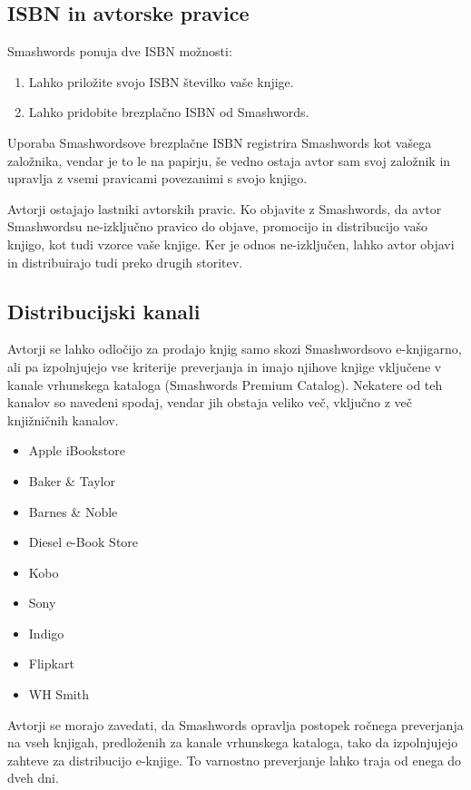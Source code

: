 \documentclass[a4paper, 12pt]{book}
\begin{document}
\subsection{ISBN in avtorske pravice}
Smashwords ponuja dve ISBN možnosti:
\begin{enumerate}
	\item Lahko priložite svojo ISBN številko vaše knjige.
	\item Lahko pridobite brezplačno ISBN od Smashwords.
\end{enumerate}

Uporaba Smashwordsove brezplačne ISBN registrira Smashwords kot vašega založnika, vendar je to le na papirju, še vedno ostaja avtor sam svoj založnik in upravlja z vsemi pravicami povezanimi s svojo knjigo.

Avtorji ostajajo lastniki avtorskih pravic. Ko objavite z Smashwords, da avtor Smashwordsu ne-izključno pravico do objave, promocijo in distribucijo vašo knjigo, kot tudi vzorce vaše knjige. Ker je odnos ne-izključen, lahko avtor objavi in distribuirajo tudi preko drugih storitev.

\subsection{Distribucijski kanali}
Avtorji se lahko odločijo za prodajo knjig samo skozi Smashwordsovo e-knjigarno, ali pa izpolnjujejo vse kriterije preverjanja in imajo njihove knjige vključene v kanale vrhunskega kataloga (Smashwords Premium Catalog). Nekatere od teh kanalov so navedeni spodaj, vendar jih obstaja veliko več, vključno z več knjižničnih kanalov. 
\begin{itemize}
	\item Apple iBookstore
	\item Baker \& Taylor
	\item Barnes \& Noble
	\item Diesel e-Book Store
	\item Kobo
	\item Sony
	\item Indigo
	\item Flipkart
	\item WH Smith
\end{itemize}

Avtorji se morajo zavedati, da Smashwords opravlja postopek ročnega preverjanja na vseh knjigah, predloženih za kanale vrhunskega kataloga, tako da izpolnjujejo zahteve za distribucijo e-knjige. To varnostno preverjanje lahko traja od enega do dveh dni.
\end{document}
